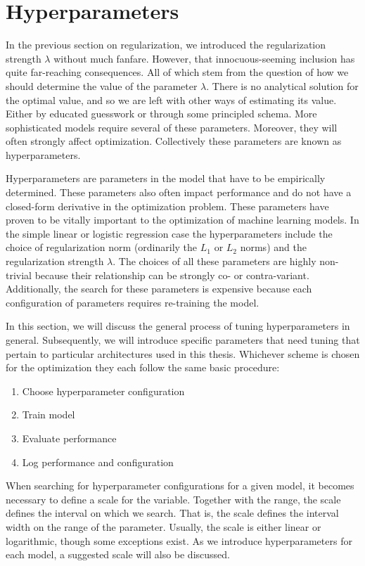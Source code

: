 \section{Hyperparameters}\label{sec:hyperparams}

In the previous section on regularization, we introduced the regularization strength $\lambda$ without much fanfare. However, that innocuous-seeming inclusion has quite far-reaching consequences. All of which stem from the question of how we should determine the value of the parameter $\lambda$. There is no analytical solution for the optimal value, and so we are left with other ways of estimating its value. Either by educated guesswork or through some principled schema. More sophisticated models require several of these parameters. Moreover, they will often strongly affect optimization. Collectively these parameters are known as hyperparameters.

Hyperparameters are parameters in the model that have to be empirically determined. These parameters also often impact performance and do not have a closed-form derivative in the optimization problem. These parameters have proven to be vitally important to the optimization of machine learning models. In the simple linear or logistic regression case the hyperparameters include the choice of regularization norm (ordinarily the $L_1$ or $L_2$ norms) and the regularization strength $\lambda$. The choices of all these parameters are highly non-trivial because their relationship can be strongly co- or contra-variant. Additionally, the search for these parameters is expensive because each configuration of parameters requires re-training the model.

In this section, we will discuss the general process of tuning hyperparameters in general. Subsequently,  we will introduce specific parameters that need tuning that pertain to particular architectures used in this thesis. Whichever scheme is chosen for the optimization they each follow the same basic procedure:

\begin{enumerate}
\item Choose hyperparameter configuration
\item Train model
\item Evaluate performance
\item Log performance and configuration
\end{enumerate}

\noindent When searching for hyperparameter configurations for a given model, it becomes necessary to define a scale for the variable. Together with the range, the scale defines the interval on which we search. That is, the scale defines the interval width on the range of the parameter. Usually, the scale is either linear or logarithmic, though some exceptions exist. As we introduce hyperparameters for each model, a suggested scale will also be discussed.

